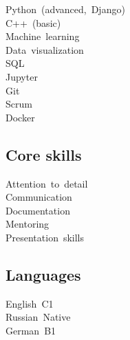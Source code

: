 \documentclass[letterpaper]{deedy-resume} %
\begin{document}
\begin{minipage}[t][0.75\textheight][t]{0.33\textwidth}
    Python~(advanced,~Django)
    \\
    C++~(basic)
    \\
    Machine~learning
    \\
    Data~visualization
    \\
    SQL
    \\
    Jupyter
    \\
    Git
    \\
    Scrum
    \\
    Docker

\sectionspace
\subsection{Core skills}
\sectionspace

    Attention~to~detail
    \\
    Communication
    \\
    Documentation
    \\
    Mentoring
    \\
    Presentation~skills

\sectionspace
\subsection{Languages}
\sectionspace

    English~C1
    \\
    Russian~Native
    \\
    German~B1


\sectionspace


\end{minipage} %
\hfill
%
%
\end{document}
